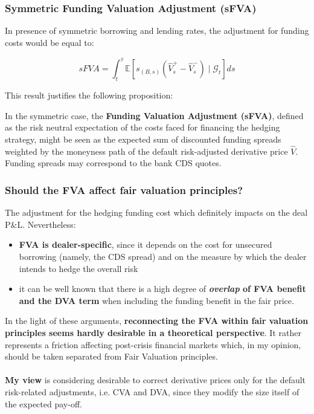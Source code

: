 \documentclass{beamer}
\begin{document}
\begin{frame}
\frametitle{Symmetric Funding Valuation Adjustment (sFVA)}
	In presence of symmetric borrowing and lending rates, the adjustment for funding costs would be equal to:

	\begin{equation}\label{FVAneg}
		sFVA = \int_{t}^{\bar{\tau} }  \mathbb{E} \left[    s_{(B,s)} \left( \hat{V}_{s}^{+} - \hat{V}_{s}^{-} \right) \mid \mathcal{G}_{t} \right] ds
	\end{equation}


	This result justifies the following proposition:
	\newtheorem{prop2}{PROPOSITION}
	\begin{prop}
		In the symmetric case, the \textbf{Funding Valuation Adjustment (sFVA)}, defined as the risk neutral expectation of the costs faced for financing the hedging strategy, might be seen as the expected sum of discounted funding spreads weighted by the moneyness path of the default risk-adjusted derivative price $\hat{V}$. Funding spreads may correspond to the bank CDS quotes.
	\end{prop}

\end{frame}


\begin{frame}
\frametitle{Should the FVA affect fair valuation principles?}
	The adjustment for the hedging funding cost which definitely impacts on the deal P\&L. Nevertheless:
	\begin{itemize}
		\item \textbf{FVA is dealer-specific}, since it depends on the cost for unsecured borrowing (namely, the CDS spread) and on the measure by which the dealer intends to hedge the overall risk
		
		\item it can be well known that there is a high degree of \textbf{\emph{overlap} of FVA benefit and the DVA term} when including the funding benefit in the fair price.
	\end{itemize}

	In the light of these arguments,\textbf{ reconnecting the FVA within fair valuation principles seems hardly desirable in a theoretical perspective}. It rather represents a friction affecting post-crisis financial markets which, in my opinion, should be taken separated from Fair Valuation principles.
	\\~\\
	\textbf{My view} is considering desirable to correct derivative prices only for the default risk-related adjustments, i.e.  CVA and DVA, since they modify the size itself of the expected pay-off. 
\end{frame}
\end{document}
